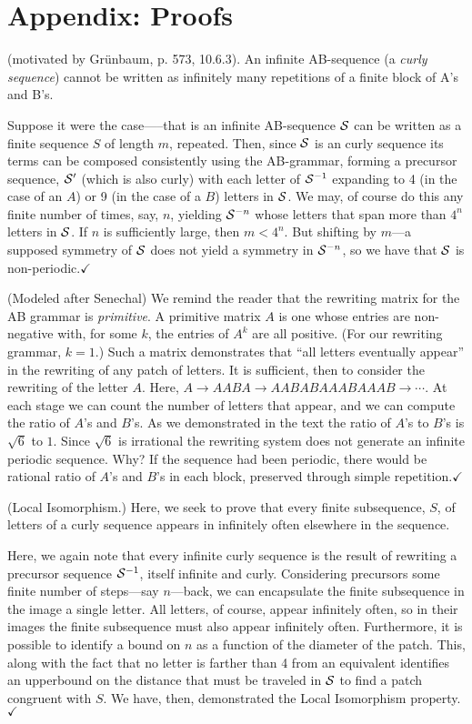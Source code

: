 \documentclass[11pt]{article}
\def\emph#1{{\em #1\/}}
\def\term#1{\emph{#1}}
\newcounter{thm}
\def\QED{$\checkmark$}
\def\ni{\noindent}
\begin{document}
\section*{Appendix: Proofs}\label{app:proofs}

\ni{\bf Proof of Theorem~\ref{thm:aperiodic}.} (motivated by Gr\"unbaum, p. 573, 10.6.3).
An infinite AB-sequence (a \term{curly sequence}) cannot be written as infinitely many repetitions of
a finite block of A's and B's.

Suppose it were the case—--that is an infinite AB-sequence $\mathcal{S}$ can be
written as a finite sequence $S$ of length $m$, repeated.  Then, since $\mathcal{S}$
is an curly sequence its terms can be composed consistently using the
AB-grammar, forming a precursor sequence, $\mathcal{S}'$ (which is also curly) with
each letter of $\mathcal{S}^{-1}$ expanding to 4 (in the case of an $A$) or 9 (in the
case of a $B$) letters in $\mathcal{S}$.  We may, of course do this any finite number
of times, say, $n$, yielding $\mathcal{S}^{-n}$ whose letters that span more than
$4^n$ letters in $\mathcal{S}$.  If $n$ is sufficiently large, then $m < 4^n$.  But
shifting by $m$---a supposed symmetry of $\mathcal{S}$ does not yield a symmetry in
$\mathcal{S}^{-n}$, so we have that $\mathcal{S}$ is non-periodic.\QED

\ni{\bf Alternative proof.}(Modeled after Senechal\cite{Se95})  
We remind the reader that the
rewriting matrix for the AB grammar is \term{primitive}.  A primitive matrix
$A$ is one whose entries are non-negative with, for some $k$, the entries of
$A^k$ are all positive. (For our rewriting grammar, $k=1$.)  Such a matrix
demonstrates that ``all letters eventually appear'' in the rewriting of any
patch of letters.  It is sufficient, then to consider the rewriting of the
letter $A$.  Here, $A\rightarrow A A B A \rightarrow A A B A B A A A B A A A B
\rightarrow \cdots$.  At each stage we can count the number of letters that
appear, and we can compute the ratio of $A$'s and $B$'s.  As we demonstrated
in the text the ratio of $A$'s to $B$'s is $\sqrt{6}$ to $1$.  Since
$\sqrt{6}$ is irrational the rewriting system does not generate an infinite
periodic sequence.  Why? If the sequence had been periodic, there would be
rational ratio of $A$'s and $B$'s in each block, preserved through simple
repetition.\QED

\medskip
\ni(Local Isomorphism.)  Here, we seek to prove that every finite subsequence, $S$, of letters of a curly sequence appears in infinitely often elsewhere in the sequence.

Here, we again note that every infinite curly sequence is the result of
rewriting a precursor sequence $\mathcal{S}^{-1}$, itself infinite and curly.
Considering precursors some finite number of steps---say $n$---back, we can encapsulate
the finite subsequence in the image a single letter.  All letters, of course,
appear infinitely often, so in their images the finite subsequence must also
appear infinitely often.  Furthermore, it is possible to identify a bound
on $n$ as a function of the diameter of the patch.  This, along with the fact
that no letter is farther than 4 from an equivalent identifies an upperbound
on the distance that must be traveled in $\mathcal{S}$ to find a patch congruent with
$S$.  We have, then, demonstrated the Local Isomorphism property.\QED

\newpage
\pagestyle{empty}
\nocite{Ch09,Ch13,VDB07}


\end{document}
